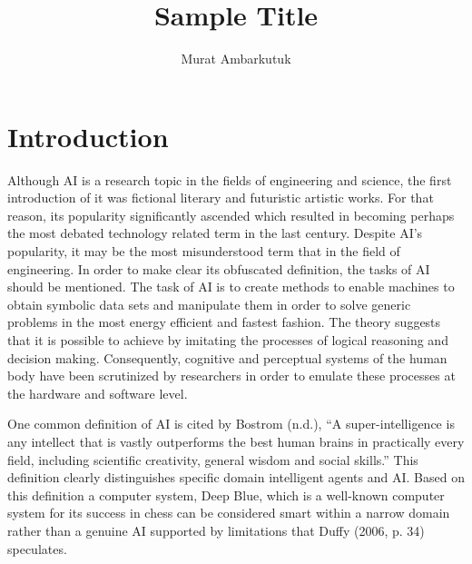 \documentclass[man]{apa6}
\title{Sample Title} %
\author{Murat Ambarkutuk}
\affiliation{English Language Institute, University of Delaware \\ murata@udel.edu}
\begin{document}
\maketitle
\section{Introduction}
Although AI is a research topic in the fields of engineering and science, the first introduction of it was fictional literary and futuristic artistic works. For that reason, its popularity significantly
ascended which resulted in becoming perhaps the most debated technology related term in the last century. Despite AI's popularity, it may be the most misunderstood term that in the field of engineering. In order to make clear its obfuscated definition, the tasks of AI should be mentioned. The task of AI is to create methods to enable machines to obtain symbolic data sets and manipulate them in order to solve generic problems in the most energy efficient and fastest fashion. The theory suggests that it is possible to achieve by imitating the processes of logical reasoning and decision making. Consequently, cognitive and perceptual systems of the human body have been scrutinized by researchers in order to emulate these processes at the hardware and software level.\par
One common definition of AI is cited by Bostrom (n.d.), “A super-intelligence is any intellect that is vastly outperforms the best human brains in practically every field, including scientific creativity, general wisdom and social skills.” This definition clearly distinguishes specific domain intelligent agents and AI. Based on this definition a computer system, Deep Blue, which is a well-known computer system for its success in chess can be considered smart within a narrow domain rather than a genuine AI supported by limitations that Duffy (2006, p. 34) speculates. 
\end{document}
